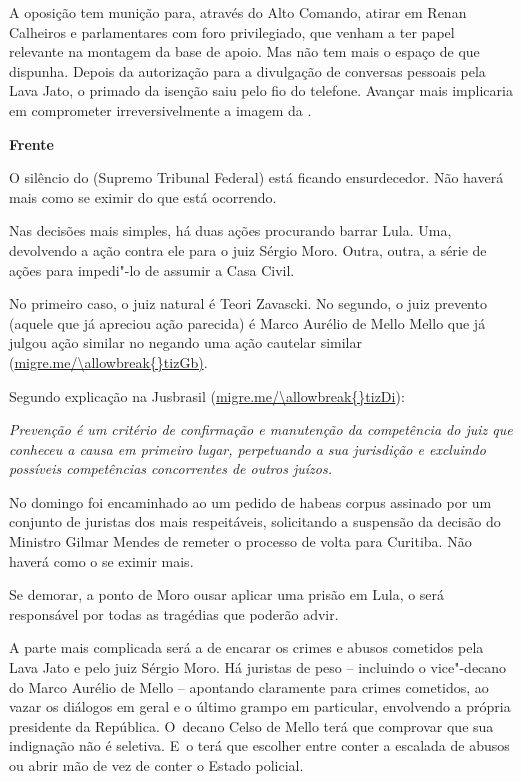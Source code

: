 A oposição tem munição para, através do Alto Comando, atirar em Renan
Calheiros e parlamentares com foro privilegiado, que venham a ter papel
relevante na montagem da base de apoio. Mas não tem mais o espaço de que
dispunha. Depois da autorização para a divulgação de conversas pessoais
pela Lava Jato, o primado da isenção saiu pelo fio do telefone. Avançar
mais implicaria em comprometer irreversivelmente a imagem da .

\textbf{Frente }

O silêncio do  (Supremo Tribunal Federal) está ficando ensurdecedor.
Não haverá mais como se eximir do que está ocorrendo.

Nas decisões mais simples, há duas ações procurando barrar Lula. Uma,
devolvendo a ação contra ele para o juiz Sérgio Moro. Outra, outra, a
série de ações para impedi"-lo de assumir a Casa Civil.

No primeiro caso, o juiz natural é Teori Zavascki. No segundo, o juiz
prevento (aquele que já apreciou ação parecida) é Marco Aurélio de Mello
Mello que já julgou ação similar no  negando uma ação cautelar
similar (\url{migre.me/\allowbreak{}tizGb)}.

Segundo explicação na Jusbrasil (\url{migre.me/\allowbreak{}tizDi}):

\emph{Prevenção é um critério de confirmação e manutenção da competência
do juiz que conheceu a causa em primeiro lugar, perpetuando a sua
jurisdição e excluindo possíveis competências concorrentes de outros
juízos.}

No domingo foi encaminhado ao  um pedido de habeas corpus assinado
por um conjunto de juristas dos mais respeitáveis, solicitando a
suspensão da decisão do Ministro Gilmar Mendes de remeter o processo de
volta para Curitiba. Não haverá como o  se eximir mais.

Se demorar, a ponto de Moro ousar aplicar uma prisão em Lula, o  será
responsável por todas as tragédias que poderão advir.

A parte mais complicada será a de encarar os crimes e abusos cometidos
pela Lava Jato e pelo juiz Sérgio Moro. Há juristas de peso -- incluindo
o vice"-decano do  Marco Aurélio de Mello -- apontando claramente para
crimes cometidos, ao vazar os diálogos em geral e o último grampo em
particular, envolvendo a própria presidente da República. O~decano Celso
de Mello terá que comprovar que sua indignação não é seletiva. E~o 
terá que escolher entre conter a escalada de abusos ou abrir mão de vez
de conter o Estado policial.


